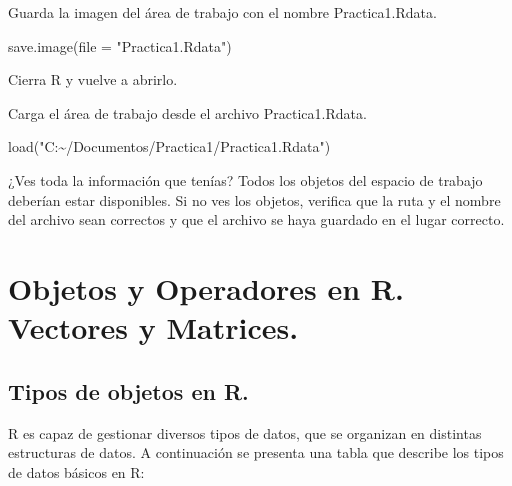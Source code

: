 \documentclass[
  letterpaper,
]{scrbook}
\newenvironment{Shaded}{\begin{snugshade}}{\end{snugshade}}
\newcommand{\AttributeTok}[1]{\textcolor[rgb]{0.40,0.45,0.13}{#1}}
\newcommand{\FunctionTok}[1]{\textcolor[rgb]{0.28,0.35,0.67}{#1}}
\newcommand{\NormalTok}[1]{\textcolor[rgb]{0.00,0.23,0.31}{#1}}
\newcommand{\StringTok}[1]{\textcolor[rgb]{0.13,0.47,0.30}{#1}}
\begin{document}
Guarda la imagen del área de trabajo con el nombre Practica1.Rdata.

\begin{Shaded}
\begin{Highlighting}[]
\FunctionTok{save.image}\NormalTok{(}\AttributeTok{file =} \StringTok{"Practica1.Rdata"}\NormalTok{)}
\end{Highlighting}
\end{Shaded}

Cierra R y vuelve a abrirlo.

Carga el área de trabajo desde el archivo Practica1.Rdata.

\begin{Shaded}
\begin{Highlighting}[]
\FunctionTok{load}\NormalTok{(}\StringTok{"C:\textasciitilde{}/Documentos/Practica1/Practica1.Rdata"}\NormalTok{)}
\end{Highlighting}
\end{Shaded}

¿Ves toda la información que tenías? Todos los objetos del espacio de
trabajo deberían estar disponibles. Si no ves los objetos, verifica que
la ruta y el nombre del archivo sean correctos y que el archivo se haya
guardado en el lugar correcto.

\part{Objetos y Operadores en R. Vectores y Matrices.}

\hypertarget{tipos-de-objetos-en-r.}{%
\chapter{Tipos de objetos en R.}\label{tipos-de-objetos-en-r.}}

R es capaz de gestionar diversos tipos de datos, que se organizan en
distintas estructuras de datos. A continuación se presenta una tabla que
describe los tipos de datos básicos en R:
\end{document}
